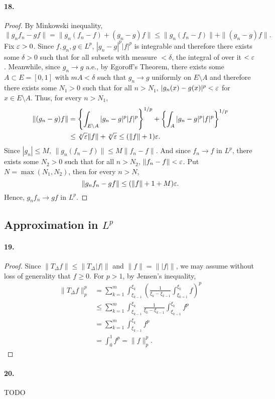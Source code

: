   \paragraph{18.}
  \begin{proof}
    By Minkowski inequality, 
    \[
      \|g_nf_n-gf\| = \|g_n(f_n-f)+(g_n-g)f\| \le \|g_n(f_n-f)\|+\|(g_n-g)f\|.
    \]
    Fix $\varepsilon>0$. Since $f,g_n,g\in L^p$, $|g_n-g|^p|f|^p$ is integrable and 
    therefore there exists some $\delta>0$ such that for all subsets with 
    measure $<\delta$, the integral of over it $<\varepsilon$. Meanwhile, since $g_n\to
    g$ a.e., by Egoroff's Theorem, there exists some $A\subset E=[0,1]$ with $mA
    <\delta$ such that $g_n\to g$ uniformly on $E\setminus A$ and therefore 
    there exists some $N_1>0$ such that for all $n>N_1$, $|g_n(x)-g(x)|^p<\varepsilon$
    for $x\in E\setminus A$. Thus, for every $n>N_1$,
    \begin{align*}
      \|(g_n-g)f\|
      &=\left\{\int_{E\setminus A}|g_n-g|^p|f|^p\right\}^{1/p} + 
        \left\{\int_A|g_n-g|^p|f|^p\right\}^{1/p} \\
      & \le \sqrt[p]{\varepsilon}\|f\| + \sqrt[p]{\varepsilon} \le (\|f\|+1)\varepsilon.
    \end{align*}
    Since $|g_n|\le M$, $\|g_n(f_n-f)\|\le M\|f_n-f\|$. And since $f_n\to f$ in 
    $L^p$, there exists some $N_2>0$ such that for all $n>N_2$, $\|f_n-f\|<
    \varepsilon$. Put $N=\max(N_1,N_2)$, then for every $n>N$,
    \[
      \|g_nf_n-gf\| \le (\|f\|+1+M)\varepsilon.
    \]
    Hence, $g_nf_n\to gf$ in $L^p$.
  \end{proof}

\subsection{Approximation in $L^p$}
  \paragraph{19.}
  \begin{proof}
    Since $\|T_\Delta f\|\le \|T_\Delta|f|\|$ and $\|f\|=\||f|\|$, we may assume
    without loss of generality that $f\ge 0$. For $p>1$, by Jensen's inequality,
    \begin{align*}
      \|T_\Delta f\|_p^p 
      &= \sum_{k=1}^m\int_{\xi_{k-1}}^{\xi_k}
      \left(\frac{1}{\xi_k-\xi_{k-1}}\int_{\xi_{k=1}}^{\xi_k}f\right)^p \\
      &\le \sum_{k=1}^m\int_{\xi_{k-1}}^{\xi_k}
      \frac{1}{\xi_k-\xi_{k-1}}\int_{\xi_{k-1}}^{\xi_k}f^p \\
      &= \sum_{k=1}^m\int_{\xi_{k-1}}^{\xi_k}f^p \\
      &= \int_0^1f^p = \|f\|_p^p.
    \end{align*}
  \end{proof}

  \paragraph{20.} TODO
